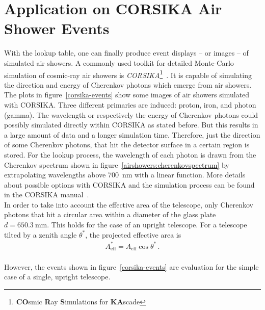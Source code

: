 \section{Application on CORSIKA Air Shower Events}

With the lookup table, one can finally produce event displays -- or images -- of simulated air showers. A commonly used toolkit for detailed Monte-Carlo simulation of cosmic-ray air showers is \textit{CORSIKA}\footnote{\textbf{CO}smic \textbf{R}ay \textbf{S}imulations for \textbf{KA}scade}~\cite{corsika:website}. It is capable of simulating the direction and energy of Cherenkov photons which emerge from air showers.\\

The plots in figure~\ref{corsika-events} show some images of air showers simulated with CORSIKA. Three different primaries are induced: proton, iron, and photon (gamma). The wavelength or respectively the energy of Cherenkov photons could possibly simulated directly within CORSIKA as stated before. But this results in a large amount of data and a longer simulation time. Therefore, just the direction of some Cherenkov photons, that hit the detector surface in a certain region is stored. For the lookup process, the wavelength of each photon is drawn from the Cherenkov spectrum shown in figure~\ref{airshowers:cherenkovspectrum} by extrapolating wavelengths above \SI{700}{\nano\meter} with a linear function. More details about possible options with CORSIKA and the simulation process can be found in the CORSIKA manual~\cite{corsika:manual}.\\

In order to take into account the effective area of the telescope, only Cherenkov photons that hit a circular area within a diameter of the glass plate $d=\SI{650.3}{\milli\meter}$. This holds for the case of an upright telescope. For a telescope tilted by a zenith angle $\theta^\ast$, the projected effective area is
\begin{align}
A_\text{eff}^\ast = A_\text{eff}\cos{\theta^\ast}\,.
\end{align}\\

However, the events shown in figure~\ref{corsika-events} are evaluation for the simple case of a single, upright telescope.

